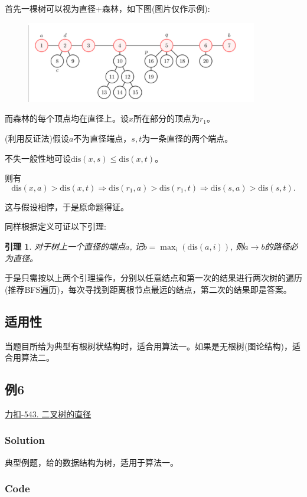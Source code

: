 \documentclass{article}
\newtheorem{lemma}{引理}
\newcommand{\dis}{\text{dis}}
\begin{document}
首先一棵树可以视为直径+森林，如下图(图片仅作示例):
\begin{figure}[H]
    \centering
    \includegraphics[width = 0.9\textwidth]{fig1.png}
\end{figure}

而森林的每个顶点均在直径上。设$x$所在部分的顶点为$r_1$。

(利用反证法)假设$a$不为直径端点，$s,t$为一条直径的两个端点。

不失一般性地可设$\text{dis}(x,s)\leq \dis(x,t)$。

则有
\begin{equation}
    \dis(x,a)>\dis(x,t) \Rightarrow \dis(r_1,a) > \dis(r_1,t) \Rightarrow \dis(s,a)>\dis(s,t).
\end{equation}

这与假设相悖，于是原命题得证。

同样根据定义可证以下引理:
\begin{lemma}
    对于树上一个直径的端点$a$, 记$b = \max_i(\dis(a,i))$, 则$a\rightarrow b$的路径必为直径。
\end{lemma}

于是只需按以上两个引理操作，分别以任意结点和第一次的结果进行两次树的遍历(推荐BFS遍历)，每次寻找到距离根节点最远的结点，第二次的结果即是答案。

\subsection{适用性}
当题目所给为典型有根树状结构时，适合用算法一。如果是无根树(图论结构)，适合用算法二。

\subsection{例6}
\href{https://leetcode.cn/problems/diameter-of-binary-tree/}{力扣-543. 二叉树的直径}
\subsubsection{Solution}
典型例题，给的数据结构为树，适用于算法一。
\subsubsection{Code}

\end{document}
